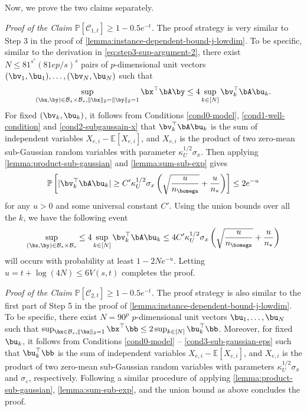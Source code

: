 \documentclass[10pt]{article}
\numberwithin{equation}{section}
\begin{document}
Now, we prove the two claims separately.

\noindent \emph{Proof of the Claim $\mathbb{P}[\mathcal{C}_{1,t}]\ge 1-0.5e^{-t}$. } The proof strategy is very similar to {\sc Step 3} in the proof of \cref{lemma:instance-dependent-bound-j-lowdim}. To be specific, similar to the derivation in \eqref{eq:step3-sup-argument-2}, there exist $N \le 81^{s^*} (81ep/s)^s$ pairs of $p$-dimensional unit vectors $(\bv_1, \bu_1),\ldots, (\bv_N, \bu_N)$ such that
\begin{align*}
    \sup_{(\bx, \by)\in \mathcal{B}_s \times \mathcal{B}_s, \|\bx\|_2=\|\by\|_2=1} \bx^\top \bA \by \le 4\sup_{k\in [N]} \bv_k^\top \bA \bu_k.
\end{align*}
For fixed $(\bv_k, \bu_k)$, it follows from Conditions \ref{cond0-model}, \ref{cond1-well-condition} and \ref{cond2-subgaussain-x} that $\bv_k^\top \bA \bu_k$ is the sum of independent variables $X_{e,i}-\mathbb{E}[X_{e,i}]$, and $X_{e,i}$ is the product of two zero-mean sub-Gaussian random variables with parameter $\kappa_U^{1/2}\sigma_x$. Then applying \cref{lemma:product-sub-gaussian} and \cref{lemma:sum-sub-exp} gives
\begin{align*}
    \mathbb{P}\left[|\bv_k^\top \bA \bu_k| \ge C' \kappa_U^{1/2} \sigma_x \left(\sqrt{\frac{u}{n_{\bomega}}} + \frac{u}{n_*}\right)\right] \le 2e^{-u}
\end{align*} for any $u>0$ and some universal constant $C'$. Using the union bounds over all the $k$, we have the following event
\begin{align*}
    \sup_{(\bx, \by)\in \mathcal{B}_s \times \mathcal{B}_s} \le 4\sup_{k\in [N]} \bv_k^\top \bA \bu_k \le 4C' \kappa_U^{1/2} \sigma_x \left(\sqrt{\frac{u}{n_{\bomega}}} + \frac{u}{n_*}\right)
\end{align*} will occurs with probability at least $1-2Ne^{-u}$. Letting $u=t+\log(4N) \le 6V(s,t)$ completes the proof.

\noindent \emph{Proof of the Claim $\mathbb{P}[\mathcal{C}_{2,t}]\ge 1-0.5e^{-t}$.} The proof strategy is also similar to the first part of {\sc Step 5} in the proof of \cref{lemma:instance-dependent-bound-j-lowdim}. To be specific, there exist $N=90^p$ $p$-dimensional unit vectors $\bu_1,\ldots, \bu_N$ such that $\sup_{\bx \in \mathcal{B}_s, \|\bx\|_2=1} \bx^\top \bb \le 2\sup_{k\in [N]} \bu_k^\top \bb$. Moreover, for fixed $\bu_k$, it follows from Conditions \ref{cond0-model} -- \ref{cond3-sub-gaussian-eps} such that $\bu_k^\top \bb$ is the sum of independent variables $X_{e,i} - \mathbb{E}[X_{e,i}]$, and $X_{e,i}$ is the product of two zero-mean sub-Gaussian random variables with parameters $\kappa_U^{1/2}\sigma_x$ and $\sigma_\varepsilon$, respectively. Following a similar procedure of applying \cref{lemma:product-sub-gaussian}, \cref{lemma:sum-sub-exp}, and the union bound as above concludes the proof.
\end{document}
